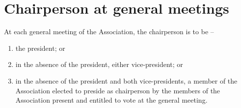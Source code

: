 \section{Chairperson at general meetings}
\label{rule:chair}

At each general meeting of the Association, the chairperson is to be --
\begin{enumerate}
	\item the president; or
	\item in the absence of the president, either vice-president; or
	\item  in the absence of the president and both vice-presidents, a member of the Association elected to preside as chairperson by the members of the Association present and entitled to vote at the general meeting.\end{enumerate}